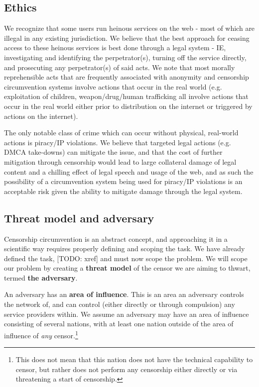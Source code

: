 \documentclass[12pt]{report}
\begin{document}
\subsection{Ethics}

We recognize that some users run heinous services on the web - most of which are illegal in any existing jurisdiction. We believe that the best approach for ceasing access to these heinous services is best done through a legal system - IE, investigating and identifying the perpetrator(s), turning off the service directly, and prosecuting any perpetrator(s) of said acts. We note that most morally reprehensible acts that are frequently associated with anonymity and censorship circumvention systems involve actions that occur in the real world (e.g. exploitation of children, weapon/drug/human trafficking all involve actions that occur in the real world either prior to distribution on the internet or triggered by actions on the internet).

The only notable class of crime which can occur without physical, real-world actions is piracy/IP violations. We believe that targeted legal actions (e.g. DMCA take-downs) can mitigate the issue, and that the cost of further mitigation through censorship would lead to large collateral damage of legal content and a chilling effect of legal speech and usage of the web, and as such the possibility of a circumvention system being used for piracy/IP violations is an acceptable risk given the ability to mitigate damage through the legal system.

\subsection{Threat model and adversary}
\label{adversary}

Censorship circumvention is an abstract concept, and approaching it in a scientific way requires properly defining and scoping the task. We have already defined the task, [TODO: xref] and must now scope the problem. We will scope our problem by creating a \textbf{threat model} of the censor we are aiming to thwart, termed \textbf{the adversary}.

An adversary has an \textbf{area of influence}. This is an area an adversary controls the network of, and can control (either directly or through compulsion) any service providers within. We assume an adversary may have an area of influence consisting of several nations, with at least one nation outside of the area of influence of \emph{any} censor.\footnote{This does not mean that this nation does not have the technical capability to censor, but rather does not perform any censorship either directly or via threatening a start of censorship.}
\end{document}
